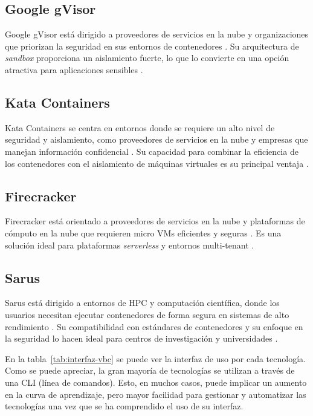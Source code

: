 \subsection{Google gVisor}
Google gVisor está dirigido a proveedores de servicios en la nube y organizaciones que priorizan la seguridad en sus entornos de contenedores \citep{LopezFalcon2024}. Su arquitectura de \textit{sandbox} proporciona un aislamiento fuerte, lo que lo convierte en una opción atractiva para aplicaciones sensibles \citep{gvisor2025}.

\subsection{Kata Containers}
Kata Containers se centra en entornos donde se requiere un alto nivel de seguridad y aislamiento, como proveedores de servicios en la nube y empresas que manejan información confidencial \citep{Viktorsson2020}. Su capacidad para combinar la eficiencia de los contenedores con el aislamiento de máquinas virtuales es su principal ventaja \citep{10.1145/1272996.1273025}.

\subsection{Firecracker}
Firecracker está orientado a proveedores de servicios en la nube y plataformas de cómputo en la nube que requieren micro VMs eficientes y seguras \citep{Jain}. Es una solución ideal para plataformas \textit{serverless} y entornos multi-tenant \citep{246288}.

\subsection{Sarus}
Sarus está dirigido a entornos de HPC y computación científica, donde los usuarios necesitan ejecutar contenedores de forma segura en sistemas de alto rendimiento \citep{Sarus2021}. Su compatibilidad con estándares de contenedores y su enfoque en la seguridad lo hacen ideal para centros de investigación y universidades \citep{B2020}.




En la tabla~\ref{tab:interfaz-vbc} se puede ver la interfaz de uso por cada tecnología. Como se puede apreciar, la gran mayoría de tecnologías se utilizan a través de una CLI (línea de comandos). Esto, en muchos casos, puede implicar un aumento en la curva de aprendizaje, pero mayor facilidad para gestionar y automatizar las tecnologías una vez que se ha comprendido el uso de su interfaz.


